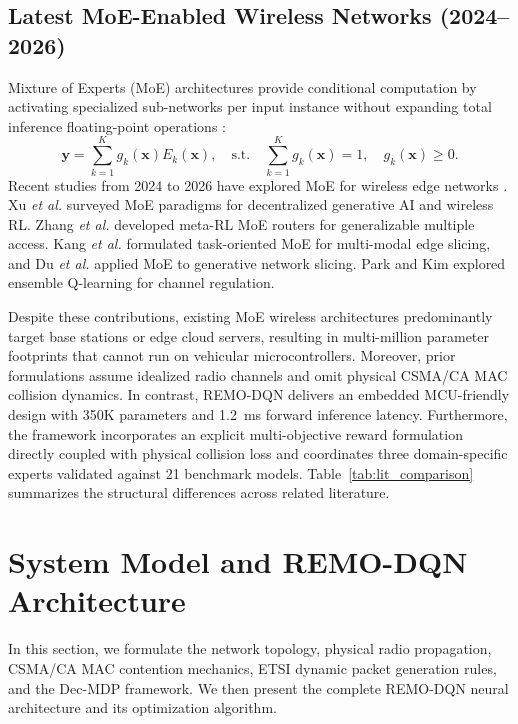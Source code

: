 \documentclass[journal]{IEEEtran}
\begin{document}
\subsection{Latest MoE-Enabled Wireless Networks (2024--2026)}
Mixture of Experts (MoE) architectures provide conditional computation by activating specialized sub-networks per input instance without expanding total inference floating-point operations \cite{Shazeer2017Outrageously}:
\begin{equation}
\label{eq:moe_convex}
\mathbf{y} = \sum_{k=1}^K g_k(\mathbf{x}) E_k(\mathbf{x}), \quad \text{s.t.} \quad \sum_{k=1}^K g_k(\mathbf{x}) = 1, \quad g_k(\mathbf{x}) \ge 0.
\end{equation}
Recent studies from 2024 to 2026 have explored MoE for wireless edge networks \cite{Xu2025Mixture, Zhang2026Generalizable, Kang2024Task, Du2025Generative, Park2025Ensemble, Bhattacharyya2024Hybrid}. Xu \textit{et al.} \cite{Xu2025Mixture} surveyed MoE paradigms for decentralized generative AI and wireless RL. Zhang \textit{et al.} \cite{Zhang2026Generalizable} developed meta-RL MoE routers for generalizable multiple access. Kang \textit{et al.} \cite{Kang2024Task} formulated task-oriented MoE for multi-modal edge slicing, and Du \textit{et al.} \cite{Du2025Generative} applied MoE to generative network slicing. Park and Kim \cite{Park2025Ensemble} explored ensemble Q-learning for channel regulation.

Despite these contributions, existing MoE wireless architectures predominantly target base stations or edge cloud servers, resulting in multi-million parameter footprints that cannot run on vehicular microcontrollers. Moreover, prior formulations assume idealized radio channels and omit physical CSMA/CA MAC collision dynamics. In contrast, REMO-DQN delivers an embedded MCU-friendly design with 350K parameters and 1.2~ms forward inference latency. Furthermore, the framework incorporates an explicit multi-objective reward formulation directly coupled with physical collision loss and coordinates three domain-specific experts validated against 21 benchmark models. Table~\ref{tab:lit_comparison} summarizes the structural differences across related literature.

\section{System Model and REMO-DQN Architecture}
In this section, we formulate the network topology, physical radio propagation, CSMA/CA MAC contention mechanics, ETSI dynamic packet generation rules, and the Dec-MDP framework. We then present the complete REMO-DQN neural architecture and its optimization algorithm.
\end{document}
